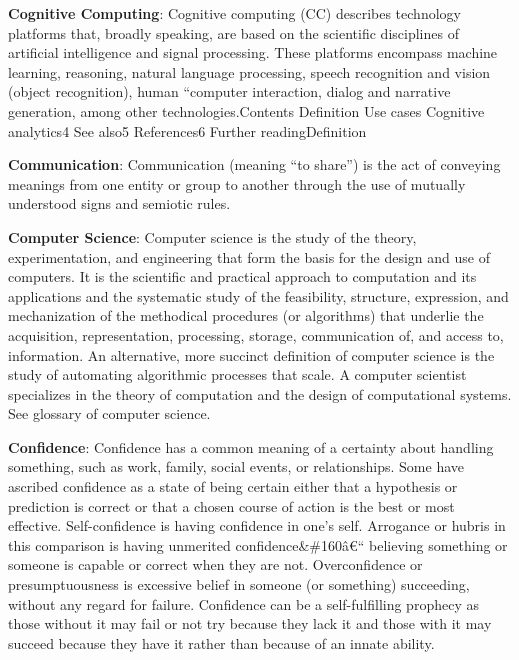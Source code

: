\documentclass[]{book}
\newcommand{\euro}{€}
\theoremstyle{definition}
\theoremstyle{definition}
\theoremstyle{definition}
\theoremstyle{remark}
\begin{document}
\textbf{Cognitive Computing}: Cognitive computing (CC) describes
technology platforms that, broadly speaking, are based on the scientific
disciplines of artificial intelligence and signal processing. These
platforms encompass machine learning, reasoning, natural language
processing, speech recognition and vision (object recognition), human
``computer interaction, dialog and narrative generation, among other
technologies.Contents Definition Use cases Cognitive analytics4 See
also5 References6 Further readingDefinition

\textbf{Communication}: Communication (meaning ``to share'') is the act
of conveying meanings from one entity or group to another through the
use of mutually understood signs and semiotic rules.

\textbf{Computer Science}: Computer science is the study of the theory,
experimentation, and engineering that form the basis for the design and
use of computers. It is the scientific and practical approach to
computation and its applications and the systematic study of the
feasibility, structure, expression, and mechanization of the methodical
procedures (or algorithms) that underlie the acquisition,
representation, processing, storage, communication of, and access to,
information. An alternative, more succinct definition of computer
science is the study of automating algorithmic processes that scale. A
computer scientist specializes in the theory of computation and the
design of computational systems. See glossary of computer science.

\textbf{Confidence}: Confidence has a common meaning of a certainty
about handling something, such as work, family, social events, or
relationships. Some have ascribed confidence as a state of being certain
either that a hypothesis or prediction is correct or that a chosen
course of action is the best or most effective. Self-confidence is
having confidence in one's self. Arrogance or hubris in this comparison
is having unmerited confidence\&\#160â\euro{}`` believing something or
someone is capable or correct when they are not. Overconfidence or
presumptuousness is excessive belief in someone (or something)
succeeding, without any regard for failure. Confidence can be a
self-fulfilling prophecy as those without it may fail or not try because
they lack it and those with it may succeed because they have it rather
than because of an innate ability.
\end{document}
